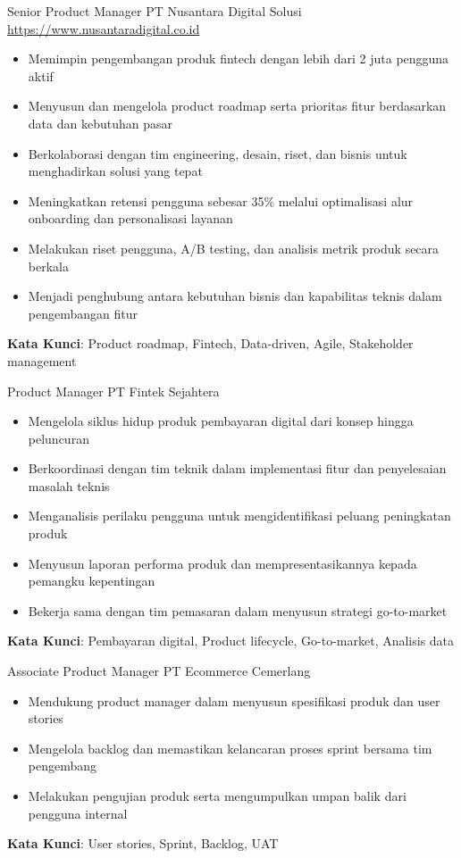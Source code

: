 \documentclass[a4paper, serif, 10pt]{moderncv}
\begin{document}
        {Senior Product Manager}
        {PT Nusantara Digital Solusi}
        {\url{https://www.nusantaradigital.co.id}}
        {}
        {\begin{itemize}
\item Memimpin pengembangan produk fintech dengan lebih dari 2 juta pengguna aktif
\item Menyusun dan mengelola product roadmap serta prioritas fitur berdasarkan data dan kebutuhan pasar
\item Berkolaborasi dengan tim engineering, desain, riset, dan bisnis untuk menghadirkan solusi yang tepat
\item Meningkatkan retensi pengguna sebesar 35\% melalui optimalisasi alur onboarding dan personalisasi layanan
\item Melakukan riset pengguna, A/B testing, dan analisis metrik produk secara berkala
\item Menjadi penghubung antara kebutuhan bisnis dan kapabilitas teknis dalam pengembangan fitur
\end{itemize}
\textbf{Kata Kunci}: Product roadmap, Fintech, Data-driven, Agile, Stakeholder management}

        {Product Manager}
        {PT Fintek Sejahtera}
        {}
        {}
        {\begin{itemize}
\item Mengelola siklus hidup produk pembayaran digital dari konsep hingga peluncuran
\item Berkoordinasi dengan tim teknik dalam implementasi fitur dan penyelesaian masalah teknis
\item Menganalisis perilaku pengguna untuk mengidentifikasi peluang peningkatan produk
\item Menyusun laporan performa produk dan mempresentasikannya kepada pemangku kepentingan
\item Bekerja sama dengan tim pemasaran dalam menyusun strategi go-to-market
\end{itemize}
\textbf{Kata Kunci}: Pembayaran digital, Product lifecycle, Go-to-market, Analisis data}

        {Associate Product Manager}
        {PT Ecommerce Cemerlang}
        {}
        {}
        {\begin{itemize}
\item Mendukung product manager dalam menyusun spesifikasi produk dan user stories
\item Mengelola backlog dan memastikan kelancaran proses sprint bersama tim pengembang
\item Melakukan pengujian produk serta mengumpulkan umpan balik dari pengguna internal
\end{itemize}
\textbf{Kata Kunci}: User stories, Sprint, Backlog, UAT}
\end{document}
